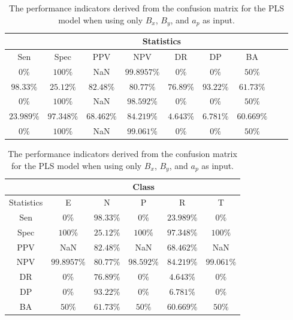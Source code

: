 \begin{table}[!ht]
	\centering
	\begin{tabular}{|c|c|c|c|c|c|c|c|c|}
		\hline
		 & \multicolumn{7}{c|}{Statistics} \\ \hline
		Sen & Spec & PPV & NPV & DR & DP & BA \\ \hline
		$0\%$ & $100\%$ & NaN & $99.8957\%$ & $0\%$ & $0\%$ & $50\%$ \\ \hline
		$98.33\%$ & $25.12\%$ & $82.48\%$ & $80.77\%$ & $76.89\%$ & $93.22\%$ & $61.73\%$ \\ \hline
		$0\%$ & $100\%$ & NaN & $98.592\%$ & $0\%$ & $0\%$ & $50\%$ \\ \hline
		$23.989\%$ & $97.348\%$ & $68.462\%$ & $84.219\%$ & $4.643\%$ & $6.781\%$ & $60.669\%$ \\ \hline
		$0\%$ & $100\%$ & NaN & $99.061\%$ & $0\%$ & $0\%$ & $50\%$ \\ \hline
	\end{tabular}
	\caption{The performance indicators derived from the confusion matrix for the PLS model when using only $B_{x}$, $B_{y}$, and $a_{p}$ as input.}
	\label{tab:cs:xyap:pls}
\end{table}

\begin{table}[!ht]
	\centering
	\begin{tabular}{|c|c|c|c|c|c|}
		\hline
		 & \multicolumn{5}{c|}{Class} \\ \hline
		Statistics & E & N & P & R & T \\ \hline
		Sen & $0\%$ & $98.33\%$ & $0\%$ & $23.989\%$ & $0\%$ \\ \hline
		Spec & $100\%$ & $25.12\%$ & $100\%$ & $97.348\%$ & $100\%$ \\ \hline
		PPV & NaN & $82.48\%$ & NaN & $68.462\%$ & NaN \\ \hline
		NPV & $99.8957\%$ & $80.77\%$ & $98.592\%$ & $84.219\%$ & $99.061\%$ \\ \hline
		DR & $0\%$ & $76.89\%$ & $0\%$ & $4.643\%$ & $0\%$ \\ \hline
		DP & $0\%$ & $93.22\%$ & $0\%$ & $6.781\%$ & $0\%$ \\ \hline
		BA & $50\%$ & $61.73\%$ & $50\%$ & $60.669\%$ & $50\%$ \\ \hline
	\end{tabular}
	\caption{The performance indicators derived from the confusion matrix for the PLS model when using only $B_{x}$, $B_{y}$, and $a_{p}$ as input.}
	\label{tab:cs:reverse:xyap:pls}
\end{table}
